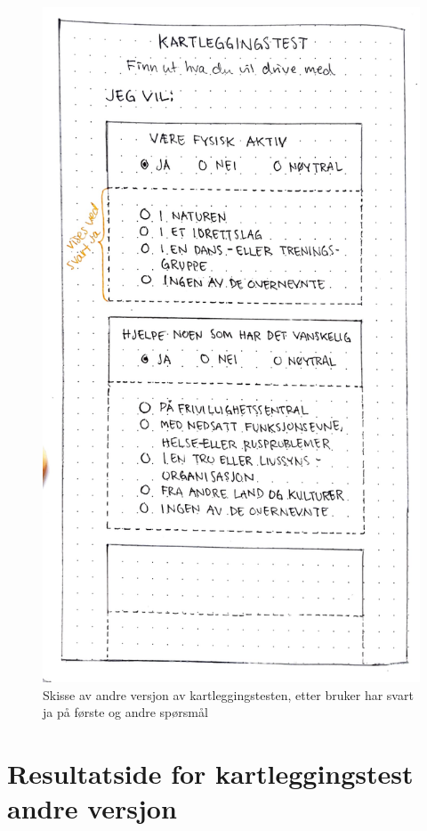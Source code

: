 \begin{figure}[H]
\centering
\includegraphics[width=.7\textwidth]{Illustrasjoner/Skisser-pdf/1.0/1-11-kartlegging-spm-utbrettsmeny.pdf}
\caption{Skisse av andre versjon av kartleggingstesten, etter bruker har svart ja på første og andre spørsmål}
\label{vedlegg:1-11-kartlegging-spm-3}
\end{figure}

\section{Resultatside for kartleggingstest andre versjon}

